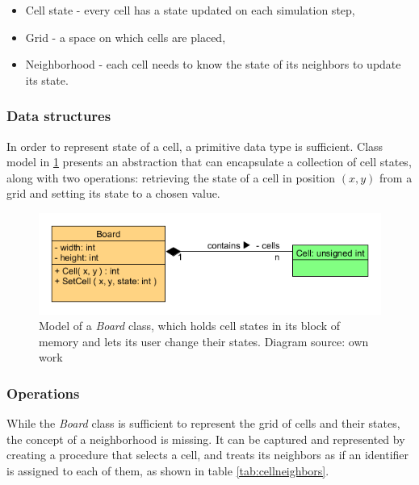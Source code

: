 \documentclass[12pt]{report}
\begin{document}
\begin{itemize}
	\item Cell state - every cell has a state updated on each simulation step,
	\item Grid - a space on which cells are placed,
	\item Neighborhood - each cell needs to know the state of its neighbors to update its state.
\end{itemize}

\subsubsection{Data structures}
In order to represent state of a cell, a primitive data type is sufficient. Class model in \cref{fig:boardcell} presents an abstraction that can encapsulate a collection of cell states, along with two operations: retrieving the state of a cell in position $(x,y)$ from a grid and setting its state to a chosen value. 

\begin{figure}[H]
	\centering
	\includegraphics[width=0.8\linewidth]{diagrams/boardcell01}
	\caption{ Model of a \textit{Board} class, which holds cell states in its block of memory and lets its user change their states. Diagram source: own work} 
	\label{fig:boardcell}
\end{figure}

\subsubsection{Operations}
While the \textit{Board} class is sufficient to represent the grid of cells and their states, the concept of a neighborhood is missing. It can be captured and represented by creating a procedure that selects a cell, and treats its neighbors as if an identifier is assigned to each of them, as shown in table \cref{tab:cellneighbors}. 
\end{document}
